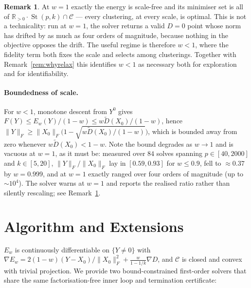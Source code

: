 \documentclass[11pt]{article}
\theoremstyle{definition}
\newtheorem{remark}[proposition]{Remark}
\DeclareMathOperator{\st}{St}
\newcommand{\R}{\mathbb{R}}
\newcommand{\Rpos}{\R_{>0}}
\newcommand{\Fnorm}[1]{\lVert #1 \rVert_F}
\begin{document}
\begin{remark}\label{rem:w1}
At $w = 1$ exactly the energy is scale-free and its minimiser set is all of
$\Rpos\cdot\st(p,k) \cap \mathcal{C}$ --- every clustering, at every scale, is
optimal. This is not a technicality: run at $w=1$, the solver returns a valid
$D=0$ point whose norm has drifted by as much as four orders of magnitude,
because nothing in the objective opposes the drift. The useful regime is
therefore $w<1$, where the fidelity term both fixes the scale and selects among
clusterings. Together with Remark~\ref{rem:whyrelax} this identifies $w<1$
as necessary both for exploration and for identifiability.
\end{remark}

\paragraph{Boundedness of scale.} For $w<1$, monotone descent from $Y^0$ gives
$F(Y) \le E_w(Y)/(1-w) \le w\tilde D(X_0)/(1-w)$, hence
$\Fnorm{Y} \ge \Fnorm{X_0}\big(1 - \sqrt{w\tilde D(X_0)/(1-w)}\big)$, which is
bounded away from zero whenever $w\tilde D(X_0) < 1-w$. Note the bound degrades
as $w\to1$ and is vacuous at $w=1$, as it must be: measured over $84$ solves
spanning $p \in [40, 2000]$ and $k \in [5,20]$, $\Fnorm{Y}/\Fnorm{X_0}$ lay in
$[0.59, 0.93]$ for $w \le 0.9$, fell to $\approx 0.37$ by $w=0.999$, and at
$w=1$ exactly ranged over four orders of magnitude (up to $\sim\!10^4$). The
solver warns at $w=1$ and reports the realised ratio rather than silently
rescaling; see Remark~\ref{rem:w1}.

\section{Algorithm and Extensions}\label{sec:algorithm}

$E_w$ is continuously differentiable on $\{Y \ne 0\}$ with
$\nabla E_w = 2(1-w)(Y-X_0)/\Fnorm{X_0}^2 + \frac{w}{1-1/k}\nabla D$, and
$\mathcal{C}$ is closed and convex with trivial projection. We provide two
bound-constrained first-order solvers that share the same factorisation-free
inner loop and termination certificate:
\end{document}
